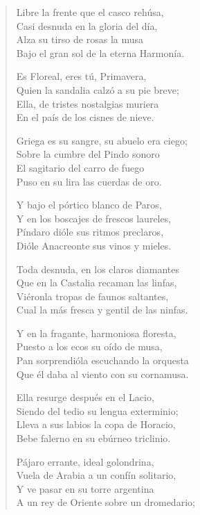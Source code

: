 \documentclass[12pt]{article}
\begin{document}
\clearpage
{}
\begin{verse}

Libre la frente que el casco rehúsa,\\
Casi desnuda en la gloria del día,\\
Alza su tirso de rosas la musa\\
Bajo el gran sol de la eterna Harmonía.  

Es Floreal, eres tú, Primavera,\\
Quien la sandalia calzó a su pie breve;\\
Ella, de tristes nostalgias muriera\\
En el país de los cisnes de nieve.  

Griega es su sangre, su abuelo era ciego;\\
Sobre la cumbre del Pindo sonoro\\
El sagitario del carro de fuego\\
Puso en su lira las cuerdas de oro.  

Y bajo el pórtico blanco de Paros,\\
Y en los boscajes de frescos laureles,\\
Píndaro dióle sus ritmos preclaros,\\
Dióle Anacreonte sus vinos y mieles.  

Toda desnuda, en los claros diamantes\\
Que en la Castalia recaman las linfas,\\
Viéronla tropas de faunos saltantes,\\
Cual la más fresca y gentil de las ninfas.  

Y en la fragante, harmoniosa floresta,\\
Puesto a los ecos su oído de musa,\\
Pan sorprendióla escuchando la orquesta\\
Que él daba al viento con su cornamusa.  

Ella resurge después en el Lacio,\\
Siendo del tedio su lengua exterminio;\\
Lleva a sus labios la copa de Horacio,\\
Bebe falerno en su ebúrneo triclinio.  

Pájaro errante, ideal golondrina,\\
Vuela de Arabia a un confín solitario,\\
Y ve pasar en su torre argentina\\
A un rey de Oriente sobre un dromedario;  


\end{verse}
\end{document}
